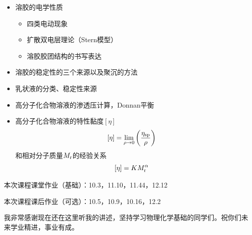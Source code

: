 \documentclass[9pt]{beamer}
\newcommand\rr{{\rm r}}
\begin{document}
	\begin{frame}
	
	\begin{itemize}
	
	\item 溶胶的电学性质
		\begin{itemize}
	
		\item 四类电动现象
		
		\item 扩散双电层理论（Stern模型）
		
		\item 溶胶胶团结构的书写表达
	
		\end{itemize}
		
	\item 溶胶的稳定性的三个来源以及聚沉的方法
	
	\item 乳状液的分类、稳定性来源
	
	\item 高分子化合物溶液的渗透压计算，Donnan平衡
	
	\item 高分子化合物溶液的特性黏度$[\eta]$
	\[
		[ \eta ] = \lim_{\rho\rightarrow0} \left( \frac{ \eta_{\rm sp} }{ \rho }  \right)
	\]	
	和相对分子质量$M_\rr$的经验关系
	\[
		[ \eta ] = K M^\alpha_\rr
	\]
		
	
	\end{itemize}		
	
	\end{frame}
	
	\begin{frame}

	本次课程课堂作业（基础）：10.3，11.10，11.44，12.12
	
	\hspace*{\fill}	
	
	本次课程课后作业（可选）：10.5，10.9，10.16，12.2
	
	\hspace*{\fill}
	
	{\color{red}我非常感谢现在还在这里听我的讲述，坚持学习物理化学基础的同学们。祝你们未来学业精进，事业有成。}
	
	\end{frame}
\end{document}
